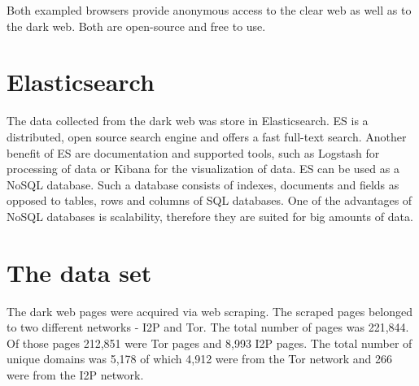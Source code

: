 Both exampled browsers provide anonymous access to the clear web as well as to the dark web. Both are open-source and free to use.

\section{Elasticsearch}  \label{Elasticsearch}
The data collected from the dark web was store in Elasticsearch. ES is a distributed, open source search engine \cite{elasticSearch} and offers a fast full-text search. Another benefit of ES are documentation and supported tools, such as Logstash \cite{logstash} for processing of data or Kibana \cite{kibana} for the visualization of data. ES can be used as a NoSQL database. Such a database consists of indexes, documents and fields as opposed to tables, rows and columns of SQL databases.  One of the advantages of NoSQL databases is scalability, therefore they are suited for big amounts of data. 

\section{The data set} \label{dataSet}
The dark web pages were acquired via web scraping. The scraped pages belonged to two different networks - I2P  and Tor. The total number of pages was 221,844. Of those pages 212,851 were Tor pages and 8,993 I2P pages. The total number of unique domains was 5,178 of which 4,912 were from the Tor network and 266 were from the I2P network. 

